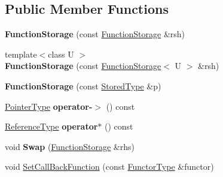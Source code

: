\subsection*{Public Member Functions}
\begin{DoxyCompactItemize}
\item 
\hypertarget{classLoki_1_1FunctionStorage_a2f5e046b3001fb5a347c80ea23718530}{}{\bfseries Function\+Storage} (const \hyperlink{classLoki_1_1FunctionStorage}{Function\+Storage} \&rsh)\label{classLoki_1_1FunctionStorage_a2f5e046b3001fb5a347c80ea23718530}

\item 
\hypertarget{classLoki_1_1FunctionStorage_a5ea4ef9fd738453790b6857bf2afb626}{}{\footnotesize template$<$class U $>$ }\\{\bfseries Function\+Storage} (const \hyperlink{classLoki_1_1FunctionStorage}{Function\+Storage}$<$ U $>$ \&rsh)\label{classLoki_1_1FunctionStorage_a5ea4ef9fd738453790b6857bf2afb626}

\item 
\hypertarget{classLoki_1_1FunctionStorage_a22c77c0991eca5dfba57bae5ff08c003}{}{\bfseries Function\+Storage} (const \hyperlink{classLoki_1_1FunctionStorage_a52a1fc18d9685e6496bde1078e6949c5}{Stored\+Type} \&p)\label{classLoki_1_1FunctionStorage_a22c77c0991eca5dfba57bae5ff08c003}

\item 
\hypertarget{classLoki_1_1FunctionStorage_a6a09030ef003aae00d26712413c1fd56}{}\hyperlink{classLoki_1_1FunctionStorage_a0e56f22b839615e3082416ca4025ca69}{Pointer\+Type} {\bfseries operator-\/$>$} () const \label{classLoki_1_1FunctionStorage_a6a09030ef003aae00d26712413c1fd56}

\item 
\hypertarget{classLoki_1_1FunctionStorage_a6f86cf90c0dec38084349de80d003f73}{}\hyperlink{classLoki_1_1FunctionStorage_a9d90fd63b1864a25cda9f1c76a276841}{Reference\+Type} {\bfseries operator$\ast$} () const \label{classLoki_1_1FunctionStorage_a6f86cf90c0dec38084349de80d003f73}

\item 
\hypertarget{classLoki_1_1FunctionStorage_afffbf664589ddf954d25fed13b762755}{}void {\bfseries Swap} (\hyperlink{classLoki_1_1FunctionStorage}{Function\+Storage} \&rhs)\label{classLoki_1_1FunctionStorage_afffbf664589ddf954d25fed13b762755}

\item 
void \hyperlink{classLoki_1_1FunctionStorage_ac55c8a149c74a27751204b0215c76041}{Set\+Call\+Back\+Function} (const \hyperlink{classLoki_1_1FunctionStorage_ae72e07ed847e973c97f8ab1e035f827a}{Functor\+Type} \&functor)
\end{DoxyCompactItemize}
